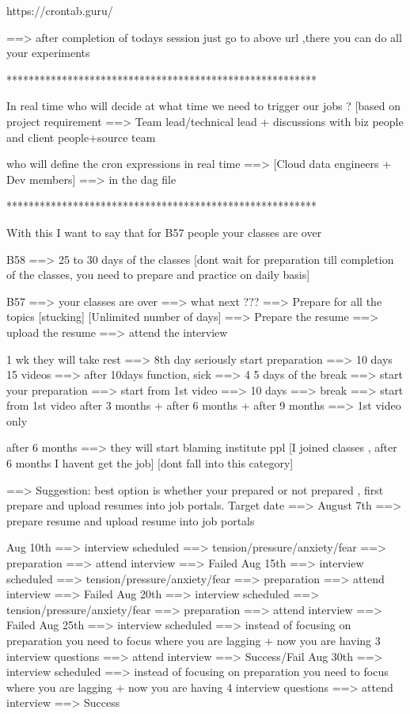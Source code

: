 https://crontab.guru/

==> after completion of todays session just go to above url ,there you can do all your experiments

********************************************************

In real time who will decide at what time we need to trigger our jobs ? [based on project requirement ==> Team lead/technical lead + discussions with biz people and client people+source team

who will define the cron expressions in real time ==> [Cloud data engineers + Dev members] ==> in the dag file 

********************************************************

With this I want to say that for B57 people your classes are over 

B58 ==> 25 to 30 days of the classes [dont wait for preparation till completion of the classes, you need to prepare and practice on daily basis]

B57 ==> your classes are over ==> what next ??? 
										==> Prepare for all the topics [stucking] [Unlimited number of days]
										==> Prepare the resume 
										==> upload the resume 
										==> attend the interview 
										
1 wk they will take rest ==> 8th day seriously start preparation ==> 10 days 15 videos ==> after 10days function, sick ==> 4 5 days of the break ==> start your preparation ==> start from 1st video ==> 10 days ==> break ==> start from 1st video 
			after 3 months + after 6 months + after 9 months ==> 1st video only
			
			after 6 months ==> they will start blaming institute ppl [I joined classes , after 6 months I havent get the job] [dont fall into this category]
			
			
==> Suggestion: best option is whether your prepared or not prepared , first prepare and upload resumes into job portals.
	Target date ==> August 7th
				==> prepare resume and upload resume into job portals
				
	Aug 10th ==> interview scheduled ==> tension/pressure/anxiety/fear ==> preparation ==> attend interview ==> Failed
	Aug 15th ==> interview scheduled ==> tension/pressure/anxiety/fear ==> preparation ==> attend interview ==> Failed
	Aug 20th ==> interview scheduled ==> tension/pressure/anxiety/fear ==> preparation ==> attend interview ==> Failed
	Aug 25th ==> interview scheduled ==> instead of focusing on preparation you need to focus where you are lagging + now you are having 3 interview questions ==> attend interview ==> Success/Fail
	Aug 30th ==> interview scheduled ==> instead of focusing on preparation you need to focus where you are lagging + now you are having 4 interview questions ==> attend interview ==> Success
	

